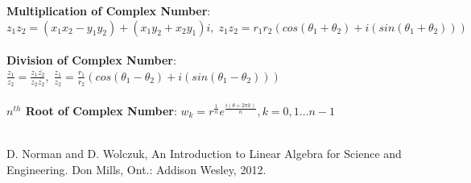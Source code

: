 \documentclass[12pt]{article}
\begin{document}
\begin{appendices}
\noindent
\textbf{Multiplication of Complex Number}: $z_1z_2 =(x_1x_2-y_1y_2) + (x_1y_2+x_2y_1)i, \; z_1z_2 = r_1r_2(cos(\theta_1+\theta_2) + i(sin(\theta_1+\theta_2)))$\\\\
\noindent
\textbf{Division of Complex Number}: $\frac{z_1}{z_2} = \frac{z_1\overline{z_2}}{z_2\overline{z_2}}, \; \frac{z_1}{z_2} = \frac{r_1}{r_2}(cos(\theta_1-\theta_2) + i(sin(\theta_1-\theta_2)))$\\\\
\textbf{$n^{th}$ Root of Complex Number}: $w_k = r^{\frac{1}{n}}e^{\frac{i(\theta+2\pi k)}{n}}, k = 0,1...n-1$\\\\
\noindent

\thispagestyle{empty}
\end{appendices}

\newpage
\begin{thebibliography}{1}
D. Norman and D. Wolczuk, An Introduction to Linear Algebra for Science and Engineering. Don Mills, Ont.: Addison Wesley, 2012.


\end {thebibliography}


 
\end{document}

